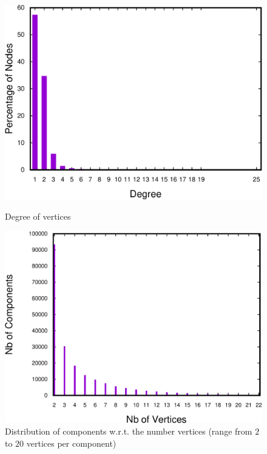 \begin{figure}[!tbp]
  \centering
     {\includegraphics[scale=0.35]{bench/generated/degree-counter-crop.pdf}}
  \caption{Degree of vertices}
    \label{fig:degree-vertices}
\end{figure}

\begin{figure}
\centering
\includegraphics[scale=0.35]{bench/generated/frequency20-crop.pdf}
\caption{Distribution of components w.r.t. the number vertices (range from $2$ to $20$ vertices per component)}
\label{fig:vertices-components-20}
\end{figure}


